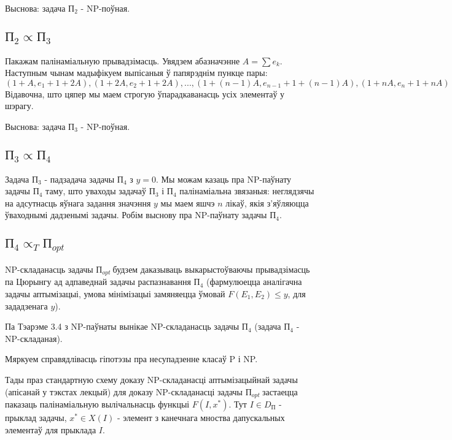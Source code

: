 \documentclass{article}
\newcommand{\opt}{${\text{П}}_{opt}\ $}
\begin{document}
Выснова: задача ${\text{П}}_{2}$ - NP-поўная.

\subsection*{${\text{П}}_{2} \propto {\text{П}}_{3}$}

Пакажам палінаміальную прывадзімасць. Увядзем абазначэнне $A = \sum{e_k}$.
Наступным чынам мадыфікуем выпісаныя ў папярэднім пункце пары:
\[
    (1+A, e_1+1+2A), (1+2A, e_2+1+2A), ... , (1+(n-1)A, e_{n-1}+1+(n-1)A), (1+nA, e_n+1+nA)
\]
Відавочна, што цяпер мы маем строгую ўпарадкаванасць усіх элементаў у шэрагу.

Выснова: задача ${\text{П}}_{3}$ - NP-поўная.

\subsection*{${\text{П}}_{3} \propto {\text{П}}_{4}$}

Задача ${\text{П}}_{3}$ - падзадача задачы ${\text{П}}_{4}$ з $y = 0$. Мы можам
казаць пра NP-паўнату задачы ${\text{П}}_{4}$ таму, што уваходы задачаў ${\text{П}}_{3}$
і ${\text{П}}_{4}$ палінаміальна звязаныя: неглядзячы на адсутнасць яўнага
задання значэння $y$ мы маем яшчэ $n$ лікаў, якія з'яўляюцца ўваходнымі дадзенымі
задачы. Робім выснову пра NP-паўнату задачы ${\text{П}}_{4}$.

\subsection*{${\text{П}}_{4} \propto_{T} {\text{П}}_{opt}$}

NP-складанасць задачы \opt будзем даказываць выкарыстоўваючы прывадзімасць па
Цюрынгу ад адпаведнай задачы распазнавання ${\text{П}}_{4}$
(фармулюецца аналігачна задачы аптымізацыі,
умова мінімізацыі замяняецца ўмовай $F(E_1, E_2) \leq y$, для зададзенага $y$).

Па Тэарэме 3.4 з NP-паўнаты вынікае NP-складанасць задачы ${\text{П}}_{4}$
(задача ${\text{П}}_{4}$ - NP-складаная).

Мяркуем справядлівасць гіпотэзы пра несупадзенне класаў P і NP.

Тады праз стандартную схему доказу NP-складанасці аптымізацыйнай задачы
(апісанай у тэкстах лекцый) для доказу NP-складанасці задачы \opt застаецца
паказаць палінаміальную вылічальнасць функцыі $F(I, x^{*})$. Тут $I \in D_{\text{П}}$ -
прыклад задачы, $x^{*} \in X(I)$ - элемент з канечнага мноства дапускальных
элементаў для прыклада $I$.
\end{document}
